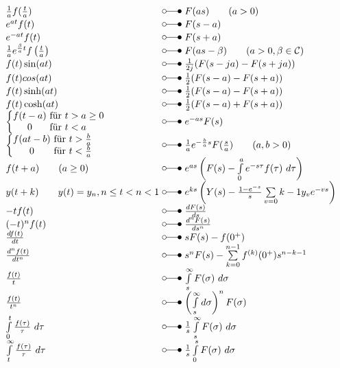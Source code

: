 \[ \begin{array}{@{}l@{ ~ \laplace ~ }l@{}}
\frac{1}{a} f(\frac{t}{a}) &
    F(a s) \qquad (a > 0) \\
e^{a t} f(t) &
    F(s - a) \\
e^{- a t} f(t) & 
    F(s + a) \\
\frac{1}{a} e^{\frac{\beta}{a}t} f\left(\frac{t}{a}\right) & 
    F(as - \beta) \qquad (a > 0, \beta \in \mathcal{C})\\
f(t) \sin(at) &
    \frac{1}{2 j}(F(s - ja) - F(s + ja)) \\
f(t) cos(at) &
    \frac{1}{2} (F(s - a) - F(s + a)) \\
f(t) \sinh(at) & 
    \frac{1}{2} (F(s - a) - F(s + a)) \\
f(t) \cosh(at) & 
    \frac{1}{2} (F(s - a) + F(s + a)) \\
\left\lbrace \begin{array}{@{}c@{}c@{}l} 
f(t - a) & \text{ für } & t > a \geq 0 \\
0        & \text{ für } & t < a
\end{array} \right. &
    e^{-as} F(s) \\
\left\lbrace \begin{array}{@{}c@{}c@{}l} 
f(at - b) & \text{ für } & t > \frac{b}{a} \\
0        & \text{ für } & t < \frac{b}{a}
\end{array} \right. &
    \frac{1}{a} e^{-\frac{b}{a}s} F(\frac{s}{a}) \qquad (a, b > 0) \\
f(t + a) \qquad (a \geq 0) &
    e^{as} \left(F(s) - \int\limits_0^a e^{-s \tau} f(\tau) ~ d\tau\right) \\
y(t + k) \qquad y(t) = y_n, n \leq t < n < 1 &
    e^{ks} \left(Y(s) - \frac{1 - e^{-s}}{s} \sum\limits_{v=0}{k-1} y_v e^{-vs}\right) \\
-t f(t) &
    \frac{d F(s)}{ds} \\
(-t)^n f(t) &
    \frac{d^n F(s)}{d s^n} \\
\frac{d f(t)}{dt} &
    s F(s) - f(0^+) \\
\frac{d^n f(t)}{d t^n} &
    s^n F(s) - \sum\limits_{k=0}^{n-1} f^{(k)} (0^+) s^{n-k-1} \\
\frac{f(t)}{t} &
    \int\limits_s^\infty F(\sigma) ~ d\sigma \\
\frac{f(t)}{t^n} &
    \left(\int\limits_s^\infty d\sigma\right)^n F(\sigma) \\
\int\limits_0^t \frac{f(\tau)}{\tau} ~ d \tau &
    \frac{1}{s} \int\limits_s^\infty F(\sigma) ~ d\sigma \\
\int\limits_t^\infty \frac{f(\tau)}{\tau} ~ d\tau &
    \frac{1}{s} \int\limits_0^s F(\sigma) ~ d\sigma \\
\end{array} \]

